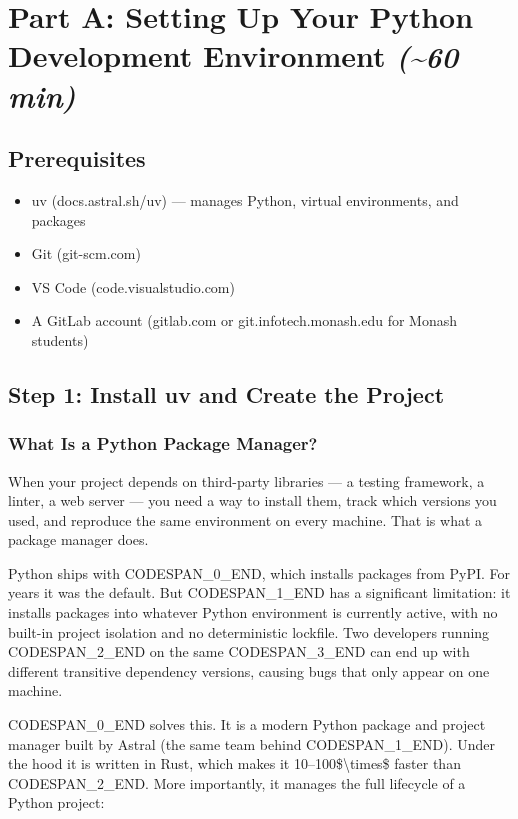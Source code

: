 \documentclass[11pt,a4paper]{book}
\begin{document}
\section{Part A: Setting Up Your Python Development Environment \textit{(\textasciitilde{}60 min)}}

\subsection{Prerequisites}

\begin{itemize}
  \item uv (docs.astral.sh/uv) --- manages Python, virtual environments, and packages
  \item Git (git-scm.com)
  \item VS Code (code.visualstudio.com)
  \item A GitLab account (gitlab.com or git.infotech.monash.edu for Monash students)
\end{itemize}

\medskip

\subsection{Step 1: Install uv and Create the Project}

\subsubsection{What Is a Python Package Manager?}

When your project depends on third-party libraries --- a testing framework, a linter, a web server --- you need a way to install them, track which versions you used, and reproduce the same environment on every machine. That is what a package manager does.

Python ships with CODESPAN\_0\_END, which installs packages from PyPI. For years it was the default. But CODESPAN\_1\_END has a significant limitation: it installs packages into whatever Python environment is currently active, with no built-in project isolation and no deterministic lockfile. Two developers running CODESPAN\_2\_END on the same CODESPAN\_3\_END can end up with different transitive dependency versions, causing bugs that only appear on one machine.

CODESPAN\_0\_END solves this. It is a modern Python package and project manager built by Astral (the same team behind CODESPAN\_1\_END). Under the hood it is written in Rust, which makes it 10--100\$\textbackslash{}times\$ faster than CODESPAN\_2\_END. More importantly, it manages the full lifecycle of a Python project:
\end{document}
